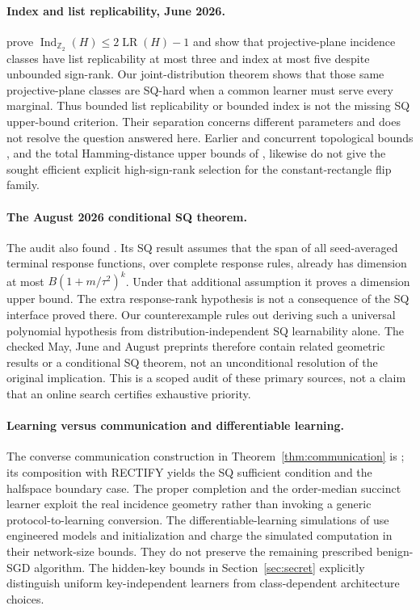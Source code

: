 \documentclass[11pt]{article}
\newcommand{\1}{\mathbf 1}
\begin{document}
\paragraph{Index and list replicability, June 2026.}
\citet[Theorems~1.1, 1.2 and 3.2]{BHHLT26} prove $\operatorname{Ind}_{\mathbb Z_2}(H)\le2\operatorname{LR}(H)-1$ and show that projective-plane incidence classes have list replicability at most three and index at most five despite unbounded sign-rank. Our joint-distribution theorem shows that those same projective-plane classes are SQ-hard when a common learner must serve every marginal. Thus bounded list replicability or bounded index is not the missing SQ upper-bound criterion. Their separation concerns different parameters and does not resolve the question answered here. Earlier and concurrent topological bounds \citep{HHM23,FHV26}, and the total Hamming-distance upper bounds of \citet{GHIS25}, likewise do not give the sought efficient explicit high-sign-rank selection for the constant-rectangle flip family.

\paragraph{The August 2026 conditional SQ theorem.}
The audit also found \citet[Assumption~4.42 and Theorem~4.9]{VALG26}. Its SQ result assumes that the span of all seed-averaged terminal response functions, over complete response rules, already has dimension at most $B(1+m/\tau^2)^k$. Under that additional assumption it proves a dimension upper bound. The extra response-rank hypothesis is not a consequence of the SQ interface proved there. Our counterexample rules out deriving such a universal polynomial hypothesis from distribution-independent SQ learnability alone. The checked May, June and August preprints therefore contain related geometric results or a conditional SQ theorem, not an unconditional resolution of the original implication. This is a scoped audit of these primary sources, not a claim that an online search certifies exhaustive priority.

\paragraph{Learning versus communication and differentiable learning.}
The converse communication construction in Theorem~\ref{thm:communication} is \citet[Proposition~3.14]{HHPTZ22}; its composition with RECTIFY yields the SQ sufficient condition and the halfspace boundary case. The proper completion and the order-median succinct learner exploit the real incidence geometry rather than invoking a generic protocol-to-learning conversion. The differentiable-learning simulations of \citet{AKMSS21} use engineered models and initialization and charge the simulated computation in their network-size bounds. They do not preserve the remaining prescribed benign-SGD algorithm. The hidden-key bounds in Section~\ref{sec:secret} explicitly distinguish uniform key-independent learners from class-dependent architecture choices.
\end{document}
